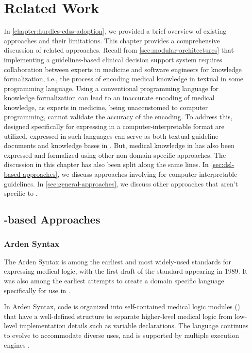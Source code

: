 \chapter{Related Work}\label{chapter:related-work}

In \autoref{chapter:hurdles-cdss-adoption}, we provided a brief
overview of existing approaches and their limitations. This chapter
provides a comprehensive discussion of related approaches. Recall
from \autoref{sec:modular-architectures} that implementing a guidelines-based
clinical decision support system requires collaboration between
experts in medicine and software engineers for knowledge formalization, i.e.,
the process of encoding medical knowledge in textual
\BPGs{} in some programming language. Using a conventional programming
language for knowledge formalization can lead to an inaccurate
encoding of medical knowledge, as experts in medicine, being unaccustomed
to computer programming, cannot validate the accuracy of the encoding.
To address this, \DSLs{} designed specifically for expressing
\BPGs{} in a computer-interpretable format are utilized. \BPGs{} expressed
in such languages can serve as both textual guideline documents and knowledge
bases in \CDSSs{}. But, medical knowledge in \BPGs{} has also been expressed
and formalized using other non domain-specific approaches. The discussion in
this chapter has also been split along the same lines. In \autoref{sec:dsl-based-approaches}, we discuss approaches involving \DSLs{} for
computer interpretable guidelines. In \autoref{sec:general-approaches}, we
discuss other approaches that aren't specific to \BPGs{}.

\section{\DSL{}-based Approaches}\label{sec:dsl-based-approaches}

\subsection{Arden Syntax}\label{sec:arden-syntax}

The Arden Syntax is among the earliest and most widely-used
standards for expressing medical logic, with the first
draft of the standard appearing in 1989.
It was also among the earliest attempts to create a domain
specific language specifically for use in \CDSSs{} \cite{SamwaldJBI12}.

In Arden Syntax, code is organized into self-contained medical
logic modules (\MLMs{}) that have a well-defined structure to
separate higher-level medical logic from low-level implementation
details such as variable declarations. The language continues to
evolve to accommodate diverse uses, and is supported by multiple execution
engines \cite{AnandMed04,KaradimasAMIA02}.

